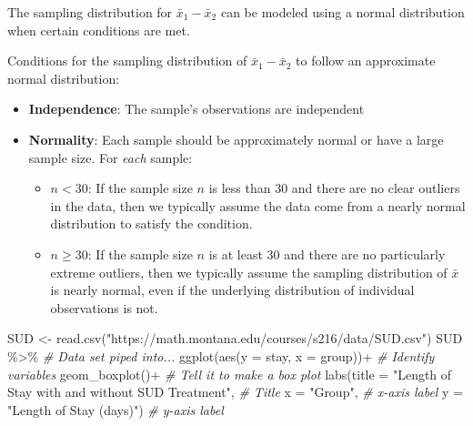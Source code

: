 \documentclass[
]{report}
\newenvironment{Shaded}{\begin{snugshade}}{\end{snugshade}}
\newcommand{\AttributeTok}[1]{\textcolor[rgb]{0.77,0.63,0.00}{#1}}
\newcommand{\CommentTok}[1]{\textcolor[rgb]{0.56,0.35,0.01}{\textit{#1}}}
\newcommand{\FunctionTok}[1]{\textcolor[rgb]{0.00,0.00,0.00}{#1}}
\newcommand{\NormalTok}[1]{#1}
\newcommand{\OtherTok}[1]{\textcolor[rgb]{0.56,0.35,0.01}{#1}}
\newcommand{\SpecialCharTok}[1]{\textcolor[rgb]{0.00,0.00,0.00}{#1}}
\newcommand{\StringTok}[1]{\textcolor[rgb]{0.31,0.60,0.02}{#1}}
\begin{document}
\vspace{0.8in}

The sampling distribution for \(\bar{x}_1-\bar{x}_2\) can be modeled using a normal distribution when certain conditions are met.

Conditions for the sampling distribution of \(\bar{x}_1-\bar{x}_2\) to follow an approximate normal distribution:

\begin{itemize}
\item
  \textbf{Independence}: The sample's observations are independent
\item
  \textbf{Normality}: Each sample should be approximately normal or have a large sample size. For \emph{each} sample:

  \begin{itemize}
  \item
    \(n < 30\): If the sample size \(n\) is less than 30 and there are no clear outliers in the data, then we typically assume the data come from a nearly normal distribution to satisfy the condition.
  \item
    \(n \ge 30\): If the sample size \(n\) is at least 30 and there are no particularly extreme outliers, then we typically assume the sampling distribution of \(\bar{x}\) is nearly normal, even if the underlying distribution of individual observations is not.
  \end{itemize}
\end{itemize}

\begin{Shaded}
\begin{Highlighting}[]
\NormalTok{SUD }\OtherTok{\textless{}{-}} \FunctionTok{read.csv}\NormalTok{(}\StringTok{"https://math.montana.edu/courses/s216/data/SUD.csv"}\NormalTok{)}
\NormalTok{SUD }\SpecialCharTok{\%\textgreater{}\%}  \CommentTok{\# Data set piped into...}
  \FunctionTok{ggplot}\NormalTok{(}\FunctionTok{aes}\NormalTok{(}\AttributeTok{y =}\NormalTok{ stay, }\AttributeTok{x =}\NormalTok{ group))}\SpecialCharTok{+}  \CommentTok{\# Identify variables}
  \FunctionTok{geom\_boxplot}\NormalTok{()}\SpecialCharTok{+}  \CommentTok{\# Tell it to make a box plot}
  \FunctionTok{labs}\NormalTok{(}\AttributeTok{title =} \StringTok{"Length of Stay with and without SUD Treatment"}\NormalTok{,  }\CommentTok{\# Title}
       \AttributeTok{x =} \StringTok{"Group"}\NormalTok{,    }\CommentTok{\# x{-}axis label}
       \AttributeTok{y =} \StringTok{"Length of Stay (days)"}\NormalTok{)  }\CommentTok{\# y{-}axis label}
\end{Highlighting}
\end{Shaded}
\end{document}
